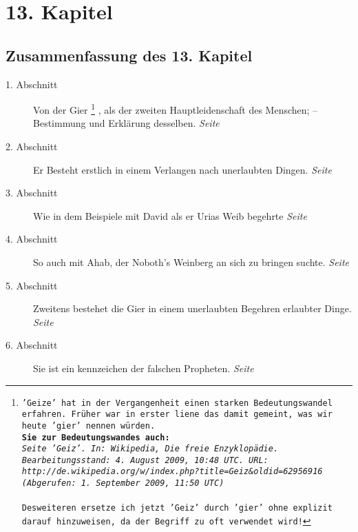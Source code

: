 
\chapter{13. Kapitel} \label{kap13}

\section{Zusammenfassung des 13. Kapitel}

\begin{description}
\item[1. Abschnitt]  Von der Gier
\footnote{\texttt{'Geize' hat in der Vergangenheit einen starken
Bedeutungswandel erfahren. Früher war in erster liene das damit gemeint, was wir
heute 'gier' nennen würden.
\\ \textbf{Sie zur Bedeutungswandes auch:}
\\ \textit{Seite 'Geiz'. In: Wikipedia, Die freie Enzyklopädie.
Bearbeitungsstand: 4. August 2009, 10:48 UTC. URL:
\\ http://de.wikipedia.org/w/index.php?title=Geiz\&oldid=62956916
\\ (Abgerufen: 1. September 2009, 11:50 UTC) }
\\ \\ Desweiteren ersetze ich jetzt 'Geiz' durch 'gier' ohne explizit darauf
hinzuweisen, da der Begriff zu oft verwendet wird!}}
, als der zweiten Hauptleidenschaft des Menschen;
-- Bestimmung und Erklärung desselben.
\dotfill \textit{Seite \pageref{kap13_ab1}}\\
\item[2. Abschnitt] Er Besteht erstlich in einem Verlangen nach unerlaubten
Dingen.
\dotfill \textit{Seite \pageref{kap13_ab2}}\\
\item[3. Abschnitt] Wie in dem Beispiele mit David als er Urias Weib begehrte
\dotfill \textit{Seite \pageref{kap13_ab3}}\\
\item[4. Abschnitt] So auch mit Ahab, der Noboth's Weinberg an sich zu bringen
suchte.
\dotfill \textit{Seite \pageref{kap13_ab4}}\\
\item[5. Abschnitt] Zweitens bestehet die Gier in einem unerlaubten Begehren
erlaubter Dinge.
\dotfill \textit{Seite \pageref{kap13_ab5}}\\
\item[6. Abschnitt] Sie ist ein kennzeichen der falschen Propheten.
\dotfill \textit{Seite \pageref{kap13_ab6}}\\

\end{description}

